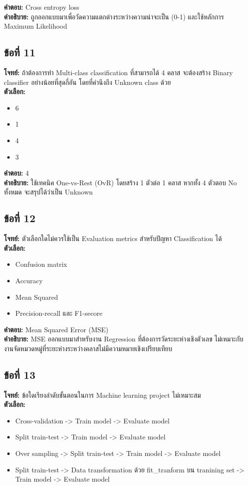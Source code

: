 \documentclass[12pt]{article}
\begin{document}
\textbf{คำตอบ:} Cross entropy loss\\
\textbf{คำอธิบาย:} ถูกออกแบบมาเพื่อวัดความแตกต่างระหว่างความน่าจะเป็น (0-1) และใช้หลักการ Maximum Likelihood

\subsection*{ข้อที่ 11}
\textbf{โจทย์:} ถ้าต้องการทำ Multi-class classification ที่สามารถได้ 4 คลาส จะต้องสร้าง Binary classifier อย่างน้อยที่สุดกี่อัน โดยที่คำนึงถึง Unknown class ด้วย\\
\textbf{ตัวเลือก:}
\begin{itemize}
    \item 6
    \item 1
    \item 4
    \item 3
\end{itemize}

\textbf{คำตอบ:} 4\\
\textbf{คำอธิบาย:} ใช้เทคนิค One-vs-Rest (OvR) โดยสร้าง 1 ตัวต่อ 1 คลาส หากทั้ง 4 ตัวตอบ No ทั้งหมด จะสรุปได้ว่าเป็น Unknown

\subsection*{ข้อที่ 12}
\textbf{โจทย์:} ตัวเลือกใดไม่ควรใช้เป็น Evaluation metrics สำหรับปัญหา Classification ได้\\
\textbf{ตัวเลือก:}
\begin{itemize}
    \item Confusion matrix
    \item Accuracy
    \item Mean Squared
    \item Precision-recall และ F1-secore
\end{itemize}

\textbf{คำตอบ:} Mean Squared Error (MSE)\\
\textbf{คำอธิบาย:} MSE ออกแบบมาสำหรับงาน Regression ที่ต้องการวัดระยะห่างเชิงตัวเลข ไม่เหมาะกับงานจัดหมวดหมู่ที่ระยะห่างระหว่างคลาสไม่มีความหมายเชิงเปรียบเทียบ

\subsection*{ข้อที่ 13}
\textbf{โจทย์:} ข้อใดเรียงลำดับขั้นตอนในการ Machine learning project ไม่เหมาะสม\\
\textbf{ตัวเลือก:}
\begin{itemize}
    \item Cross-validation -> Train model -> Evaluate model
    \item Split train-test -> Train model -> Evaluate model
    \item Over sampling -> Split train-test -> Train model -> Evaluate model
    \item Split train-test -> Data transformation ด้วย fit\_tranform บน tranining set -> Train model -> Evaluate model
\end{itemize}
\end{document}
